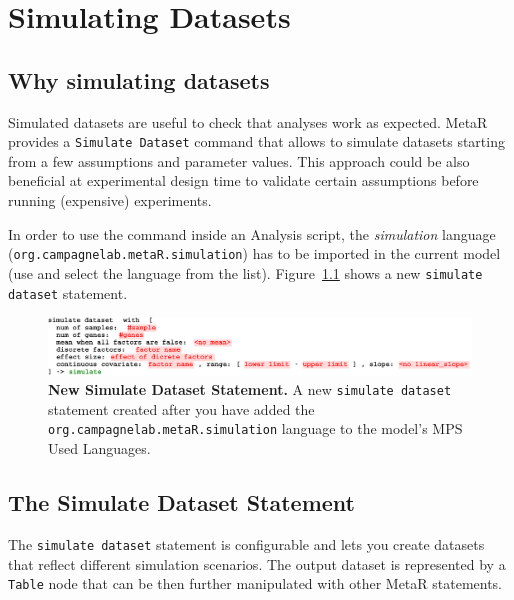 

\chapter{Simulating Datasets}\label{chap:SimulatingDatasets}

\section{Why simulating datasets}

Simulated datasets are useful to check that analyses work as expected. MetaR provides a \texttt{Simulate Dataset} command that allows to simulate datasets starting from a few assumptions and parameter values. This approach could be also beneficial at experimental design time to validate certain assumptions before running (expensive) experiments.

  In order to use the command inside an Analysis script, the \textit{simulation} language (\texttt{org\allowbreak.campagnelab\allowbreak.metaR\allowbreak.simulation}) has to be imported in the current model (use  and select the language from the list). Figure~\ref{fig:NewSimulateStatement} shows a new \texttt{simulate dataset} statement.

\begin{figure}[h!tbp]
  \centering
  \includegraphics[width=\figWidthWide]{figures/NewSimulateStatement.pdf}
\caption[New Simulate Dataset Statement.]{\textbf{New Simulate Dataset Statement.} A new \texttt{simulate dataset} statement created after you have added the \texttt{org.campagnelab.metaR.simulation} language to the model's MPS Used Languages.}
\label{fig:NewSimulateStatement}
\end{figure}
 

\section{The Simulate Dataset Statement}
The \texttt{simulate dataset} statement is configurable and lets you create datasets that reflect different simulation scenarios.  The output dataset is represented by a \texttt{Table} node that can be then further manipulated with other MetaR statements. 

